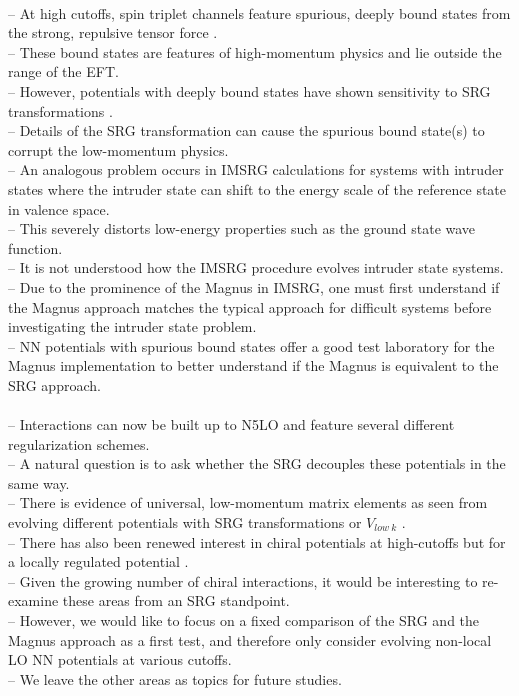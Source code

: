 \documentclass[preprintnumbers,floatfix,aps,prc,preprint,nofootinbib]{revtex4-1}
\begin{document}
\\
-- At high cutoffs, spin triplet channels feature spurious, deeply bound states from the strong, repulsive tensor force \cite{Nogga:2005hy}.
\\
-- These bound states are features of high-momentum physics and lie outside the range of the EFT.
\\
-- However, potentials with deeply bound states have shown sensitivity to SRG transformations \cite{Glazek:2008pg, Wendt:2011qj}.
\\
-- Details of the SRG transformation can cause the spurious bound state(s) to corrupt the low-momentum physics.
\\
-- An analogous problem occurs in IMSRG calculations for systems with intruder states where the intruder state can shift to the energy scale of the reference state in valence space.
\\
-- This severely distorts low-energy properties such as the ground state wave function.
\\
-- It is not understood how the IMSRG procedure evolves intruder state systems.
\\
-- Due to the prominence of the Magnus in IMSRG, one must first understand if the Magnus approach matches the typical approach for difficult systems before investigating the intruder state problem.
\\
-- NN potentials with spurious bound states offer a good test laboratory for the Magnus implementation to better understand if the Magnus is equivalent to the SRG approach. 
\\

\\
-- Interactions can now be built up to N5LO and feature several different regularization schemes.
\\
-- A natural question is to ask whether the SRG decouples these potentials in the same way.
\\
-- There is evidence of universal, low-momentum matrix elements as seen from evolving different potentials with SRG transformations or $V_{low~k}$ \cite{Dainton:2013axa}.
\\
-- There has also been renewed interest in chiral potentials at high-cutoffs but for a locally regulated potential \cite{Tews:2018sbi}.
\\
-- Given the growing number of chiral interactions, it would be interesting to re-examine these areas from an SRG standpoint.
\\
-- However, we would like to focus on a fixed comparison of the SRG and the Magnus approach as a first test, and therefore only consider evolving non-local LO NN potentials at various cutoffs.
\\
-- We leave the other areas as topics for future studies.
\\
\end{document}
